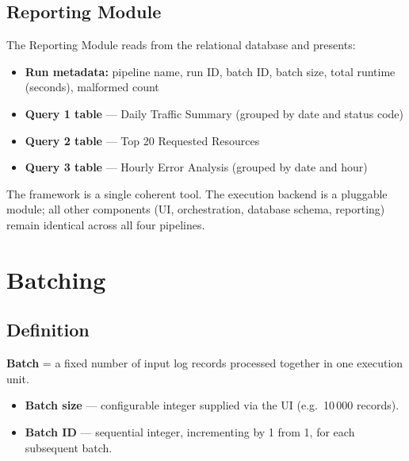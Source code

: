 \documentclass[11pt,a4paper]{article}
\begin{document}
\subsection{Reporting Module}

The Reporting Module reads from the relational database and presents:
\begin{itemize}
  \item \textbf{Run metadata:} pipeline name, run ID, batch ID, batch size, total runtime (seconds), malformed count
  \item \textbf{Query 1 table} --- Daily Traffic Summary (grouped by date and status code)
  \item \textbf{Query 2 table} --- Top 20 Requested Resources
  \item \textbf{Query 3 table} --- Hourly Error Analysis (grouped by date and hour)
\end{itemize}

\begin{notebox}
The framework is a single coherent tool. The execution backend is a pluggable module; all other components (UI, orchestration, database schema, reporting) remain identical across all four pipelines.
\end{notebox}

\section{Batching}
\subsection{Definition}

\begin{tcolorbox}[basebox, colback=LightBg, colframe=AccentCyan,
                  title={Batch Definition}]
\textbf{Batch} = a fixed number of input log records processed together in one execution unit.

\begin{itemize}
  \item \textbf{Batch size} --- configurable integer supplied via the UI (e.g.\ 10\,000 records).
  \item \textbf{Batch ID} --- sequential integer, incrementing by 1 from 1, for each subsequent batch.
\end{itemize}
\end{tcolorbox}
\end{document}
